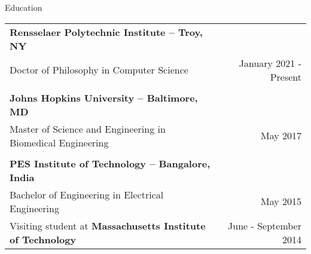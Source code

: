 \documentclass{resume}
\begin{document}
\thispagestyle{empty}
  \begin{rSection}{Education}
\begin{tabular*}{\textwidth}{@{\extracolsep{\fill}}lr@{}}
\textbf{\large Rensselaer Polytechnic Institute -- Troy, NY} &  \\
{Doctor of Philosophy in Computer Science} & January 2021 - Present \\
\\
\textbf{\large Johns Hopkins University -- Baltimore, MD} &  \\
{Master of Science and Engineering in Biomedical Engineering} & May 2017 \\
\\
\textbf{\large PES Institute of Technology -- Bangalore, India} & \\
{Bachelor of Engineering in Electrical Engineering} & May 2015 \\
Visiting student at \textbf{Massachusetts Institute of Technology} & June - September 2014
\end{tabular*}
  \end{rSection}
\end{document}
